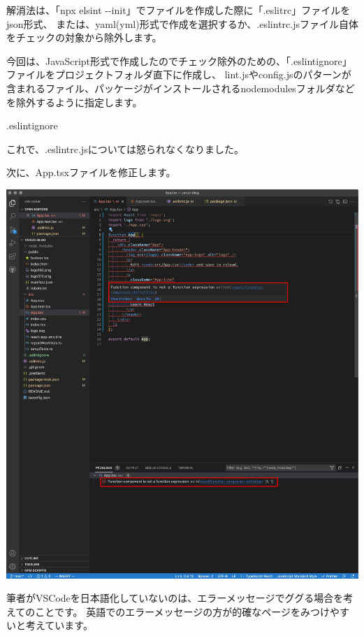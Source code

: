 \vspace*{\baselineskip}

解消法は、「npx elsint {-}{-}init」でファイルを作成した際に「.eslitrc」ファイルをjson形式、
または、yaml(yml)形式で作成を選択するか、.eslintrc.jsファイル自体をチェックの対象から除外します。

\vspace*{\baselineskip}

今回は、JavaScript形式で作成したのでチェック除外のための、「.eslintignore」ファイルをプロジェクトフォルダ直下に作成し、
lint.jsやconfig.jsのパターンが含まれるファイル、パッケージがインストールされるnode\textunderscore{}modulesフォルダなどを除外するように指定します。

\def\startercodeblockfontsize{}
\begin{starterprogram}[]{.eslintignore}\end{starterprogram}

これで、.eslintrc.jsについては怒られなくなりました。

次に、App.tsxファイルを修正します。

\begin{reviewimage}[H]%
\includegraphics[width=1.0\maxwidth]{./images/02-create-react-app/032_app_tsx_error.png}%
\label{image:02-create-react-app:032_app_tsx_error}
\end{reviewimage}
\begin{starternote}[]{}

筆者がVSCodeを日本語化していないのは、エラーメッセージでググる場合を考えてのことです。
英語でのエラーメッセージの方が的確なページをみつけやすいと考えています。

\end{starternote}


